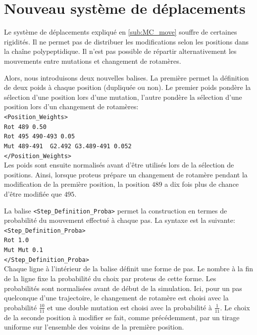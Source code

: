 \section{Nouveau système de déplacements}

Le système de déplacements expliqué en \ref{sub:MC_move}  souffre de certaines rigidités. Il ne permet pas de distribuer les modifications selon les positions dans la chaîne polypeptidique. Il n'est pas possible de répartir alternativement les mouvements entre mutations et changement de rotamères.

Alors, nous introduisons deux nouvelles balises. La première permet la définition de deux poids à chaque position (dupliquée ou non). Le premier poids pondère la sélection d'une position lors d'une mutation, l'autre pondère la sélection d'une position lors d'un changement de rotamères:\\
\verb!<Position_Weights>! \\
\verb!Rot 489 0.50 ! \\
\verb!Rot 495 490-493 0.05 ! \\
\verb!Mut 489-491  G2.492 G3.489-491 0.052 ! \\
\verb!</Position_Weights>! \\
Les poids sont ensuite normalisés avant d'être utilisés lors de la sélection de positions. Ainsi, lorsque proteus prépare un changement de rotamère pendant la modification de la première position, la position $489$ a dix fois plus de chance d'être modifiée que $495$.

La balise \verb!<Step_Definition_Proba>! permet la construction en termes de probabilité du mouvement effectué à chaque pas. La syntaxe est la suivante:\\
\verb!<Step_Definition_Proba>! \\
\verb!Rot 1.0! \\
\verb!Mut Mut 0.1! \\
\verb!</Step_Definition_Proba>! \\
Chaque ligne à l'intérieur de la balise définit une forme de pas. Le nombre à la fin de la ligne fixe la probabilité du choix par proteus de cette forme. Les probabilités sont normalisées avant de début de la simulation. Ici, pour un pas quelconque d'une trajectoire, le changement de rotamère est choisi avec la probabilité $\frac{10}{11}$ et une double mutation est choisi avec la probabilité à $\frac{1}{11}$. Le choix de la seconde position à modifier se fait, comme précédemment, par un tirage uniforme sur l'ensemble des voisins de la première position.


